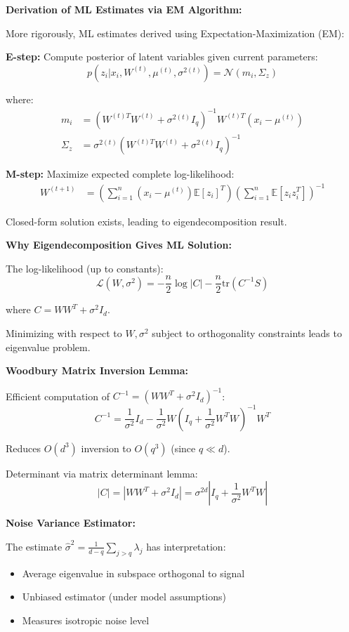 \documentclass[12pt]{article}
\begin{document}
\begin{explanation}

\textbf{Derivation of ML Estimates via EM Algorithm:}

More rigorously, ML estimates derived using Expectation-Maximization (EM):

\textbf{E-step:} Compute posterior of latent variables given current parameters:
\[
p(z_i | x_i, W^{(t)}, \mu^{(t)}, \sigma^{2(t)}) = \mathcal{N}(m_i, \Sigma_z)
\]

where:
\begin{align*}
m_i &= (W^{(t)T}W^{(t)} + \sigma^{2(t)}I_q)^{-1}W^{(t)T}(x_i - \mu^{(t)}) \\
\Sigma_z &= \sigma^{2(t)}(W^{(t)T}W^{(t)} + \sigma^{2(t)}I_q)^{-1}
\end{align*}

\textbf{M-step:} Maximize expected complete log-likelihood:
\begin{align*}
W^{(t+1)} &= \left(\sum_{i=1}^n (x_i - \mu^{(t)})\mathbb{E}[z_i]^T\right)\left(\sum_{i=1}^n \mathbb{E}[z_iz_i^T]\right)^{-1}
\end{align*}

Closed-form solution exists, leading to eigendecomposition result.

\textbf{Why Eigendecomposition Gives ML Solution:}

The log-likelihood (up to constants):
\[
\mathcal{L}(W, \sigma^2) = -\frac{n}{2}\log|C| - \frac{n}{2}\text{tr}(C^{-1}S)
\]

where $C = WW^T + \sigma^2 I_d$.

Minimizing with respect to $W, \sigma^2$ subject to orthogonality constraints leads to eigenvalue problem.

\textbf{Woodbury Matrix Inversion Lemma:}

Efficient computation of $C^{-1} = (WW^T + \sigma^2 I_d)^{-1}$:
\[
C^{-1} = \frac{1}{\sigma^2}I_d - \frac{1}{\sigma^2}W(I_q + \frac{1}{\sigma^2}W^TW)^{-1}W^T
\]

Reduces $O(d^3)$ inversion to $O(q^3)$ (since $q \ll d$).

Determinant via matrix determinant lemma:
\[
|C| = |WW^T + \sigma^2 I_d| = \sigma^{2d}|I_q + \frac{1}{\sigma^2}W^TW|
\]

\textbf{Noise Variance Estimator:}

The estimate $\hat{\sigma}^2 = \frac{1}{d-q}\sum_{j>q}\lambda_j$ has interpretation:
\begin{itemize}
    \item Average eigenvalue in subspace orthogonal to signal
    \item Unbiased estimator (under model assumptions)
    \item Measures isotropic noise level
\end{itemize}


\end{explanation}
\end{document}
